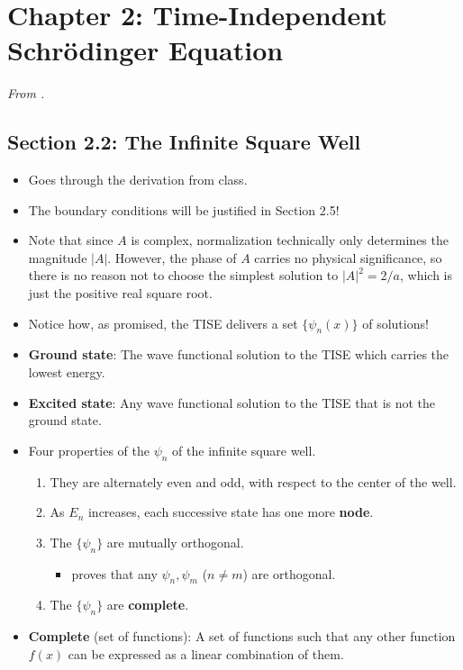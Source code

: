 \documentclass[../notes.tex]{subfiles}
\begin{document}
\section{Chapter 2: Time-Independent Schr\"{o}dinger Equation}
\emph{From \textcite{bib:Griffiths}.}
\subsection*{Section 2.2: The Infinite Square Well}
\begin{itemize}
    \item {}Goes through the derivation from class.
    \item The boundary conditions will be justified in Section 2.5!
    \item Note that since $A$ is complex, normalization technically only determines the magnitude $|A|$. However, the phase of $A$ carries no physical significance, so there is no reason not to choose the simplest solution to $|A|^2=2/a$, which is just the positive real square root.
    \item Notice how, as promised, the TISE delivers a set $\{\psi_n(x)\}$ of solutions!
    \item \textbf{Ground state}: The wave functional solution to the TISE which carries the lowest energy.
    \item \textbf{Excited state}: Any wave functional solution to the TISE that is not the ground state.
    \item Four properties of the $\psi_n$ of the infinite square well.
    \begin{enumerate}
        \item They are alternately even and odd, with respect to the center of the well.
        \item As $E_n$ increases, each successive state has one more \textbf{node}.
        \item The $\{\psi_n\}$ are mutually orthogonal.
        \begin{itemize}
            \item \textcite{bib:Griffiths} proves that any $\psi_n,\psi_m$ ($n\neq m$) are orthogonal.
        \end{itemize}
        \item The $\{\psi_n\}$ are \textbf{complete}.
    \end{enumerate}
    \item \textbf{Complete} (set of functions): A set of functions such that any other function $f(x)$ can be expressed as a linear combination of them.

\end{itemize}
\end{document}
